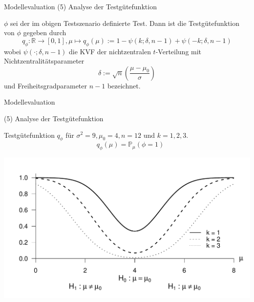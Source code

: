 \documentclass[
  8pt,
  ignorenonframetext,
]{beamer}
\begin{document}
\begin{frame}{Modellevaluation}
\protect\hypertarget{modellevaluation-7}{}
\noindent (5) Analyse der Testgütefunktion \vspace{1cm}

\small
\begin{theorem}[Testgütefunktion]
\justifying
\normalfont
$\phi$ sei der im obigen Testszenario definierte Test. Dann ist die
Testgütefunktion von $\phi$ gegeben durch
\begin{equation}
q_{\phi} : \mathbb{R} \to [0,1],
\mu \mapsto q_{\phi}(\mu)
:= 1 - \psi(k;\delta,n-1) + \psi(-k;\delta,n-1)
\end{equation}
wobei $\psi(\cdot; \delta, n-1)$  die KVF der nichtzentralen $t$-Verteilung mit
Nichtzentralitätsparameter
\begin{equation}
\delta := \sqrt{n}\left(\frac{\mu - \mu_0}{\sigma}\right)
\end{equation}
und Freiheitsgradparameter $n-1$ bezeichnet.
\end{theorem}
\end{frame}

\begin{frame}{Modellevaluation}
\protect\hypertarget{modellevaluation-8}{}

\noindent (5) Analyse der Testgütefunktion \vspace{5mm}

\small

\center Testgütefunktion \(q_\phi\) für
\(\sigma^2 = 9, \mu_0 = 4, n = 12\) und \(k = 1,2,3\). \vspace{2mm}
\begin{equation*}
\quad q_{\phi}(\mu) = \mathbb{P}_\mu(\phi = 1)
\end{equation*}

\begin{center}\includegraphics[width=0.8\linewidth]{9_Abbildungen/alm_9_t_test_ungerichtet_guetefunktion} \end{center}
\end{frame}
\end{document}
